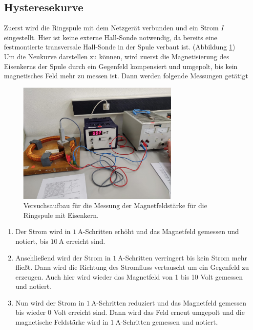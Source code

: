 \subsection{Hysteresekurve}
Zuerst wird die Ringspule mit dem Netzgerät verbunden und ein Strom $I$ eingestellt. Hier ist keine externe Hall-Sonde notwendig,
da bereits eine festmontierte transversale Hall-Sonde in der Spule verbaut ist. (Abbildung \ref{fig:hysterese})\\ 
Um die Neukurve darstellen zu können, wird zuerst die Magnetisierung des Eisenkerns der Spule durch ein Gegenfeld
kompensiert und umgepolt, bis kein magnetisches Feld mehr zu messen ist. Dann werden folgende Messungen getätigt
\begin{figure}
    \centering
    \includegraphics[height=6cm]{content/ring.jpg}
    \caption{Versuchsaufbau für die Messung der Magnetfeldstärke für die Ringspule mit Eisenkern.}
    \label{fig:hysterese}
\end{figure}
\FloatBarrier
\begin{enumerate}
    \item Der Strom wird in $\SI{1}{\ampere}$-Schritten erhöht und das Magnetfeld gemessen und notiert, bis $\SI{10}{\ampere}$ erreicht sind.
    \item Anschließend wird der Strom in $\SI{1}{\ampere}$-Schritten verringert bis kein Strom mehr fließt. Dann wird die Richtung
    des Stromfluss vertauscht um ein Gegenfeld zu erzeugen. Auch hier wird wieder das Magnetfeld von 1 bis 10 Volt gemessen und notiert.
    \item Nun wird der Strom in $\SI{1}{\ampere}$-Schritten reduziert und das Magnetfeld gemessen bis wieder 0 Volt erreicht sind. Dann wird das Feld erneut umgepolt
    und die magnetische Feldstärke wird in $\SI{1}{\ampere}$-Schritten gemessen und notiert.
\end{enumerate}
